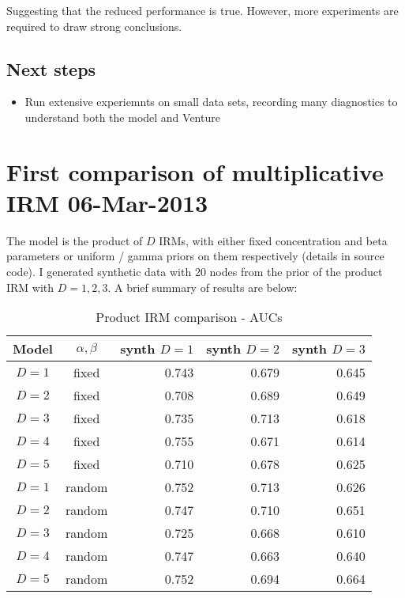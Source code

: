 \documentclass[twoside,11pt]{article}
\begin{document}
%
Suggesting that the reduced performance is true.
However, more experiments are required to draw strong conclusions.

\subsection{Next steps}

\begin{itemize}
\item Run extensive experiemnts on small data sets, recording many diagnostics to understand both the model and Venture
\end{itemize}

\section{First comparison of multiplicative IRM 06-Mar-2013}

The model is the product of $D$ IRMs, with either fixed concentration and beta parameters or uniform / gamma priors on them respectively (details in source code).
I generated synthetic data with 20 nodes from the prior of the product IRM with $D = 1,2,3$.
A brief summary of results are below:

\begin{table*}[ht!]
\caption{{\small
Product IRM comparison - AUCs
}}
\label{tbl:Product IRM 06-Mar-2013}
\begin{center}
\begin{tabular}{c c | r r r}
Model & $\alpha, \beta$ & synth $D=1$ & synth $D=2$ & synth $D=3$ \\
\hline
$D=1$ & fixed & 0.743 &  0.679 &  0.645 \\
$D=2$ & fixed & 0.708 &  0.689 &  0.649 \\
$D=3$ & fixed & 0.735 &  0.713 &  0.618 \\
$D=4$ & fixed & 0.755 &  0.671 &  0.614 \\
$D=5$ & fixed & 0.710 &  0.678 &  0.625 \\
\hline
$D=1$ & random & 0.752 &  0.713 &  0.626 \\
$D=2$ & random & 0.747 &  0.710 &  0.651 \\
$D=3$ & random & 0.725 &  0.668 &  0.610 \\
$D=4$ & random & 0.747 &  0.663 &  0.640 \\
$D=5$ & random & 0.752 &  0.694 &  0.664 \\
\end{tabular}
\end{center}
\end{table*}
\end{document}
